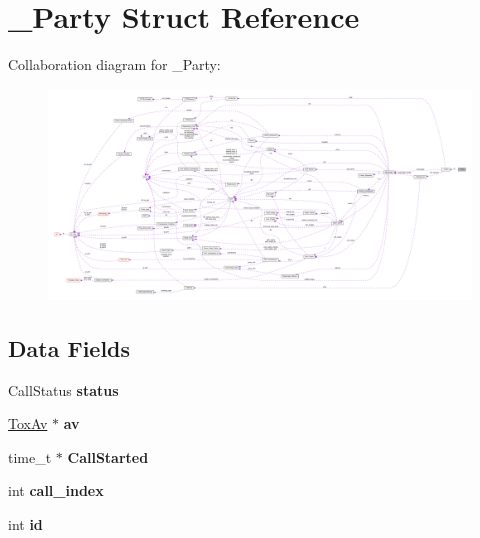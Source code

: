 \hypertarget{struct___party}{\section{\+\_\+\+Party Struct Reference}
\label{struct___party}
}


Collaboration diagram for \+\_\+\+Party\+:\nopagebreak
\begin{figure}[H]
\begin{center}
\leavevmode
\includegraphics[width=350pt]{struct___party__coll__graph}
\end{center}
\end{figure}
\subsection*{Data Fields}
\begin{DoxyCompactItemize}
\item 
\hypertarget{struct___party_a722fcd2c2e22cc6de0a53383e5871290}{Call\+Status {\bfseries status}}\label{struct___party_a722fcd2c2e22cc6de0a53383e5871290}

\item 
\hypertarget{struct___party_abcfe1d5431cfdb232964a0a3380f4e7e}{\hyperlink{struct___tox_av}{Tox\+Av} $\ast$ {\bfseries av}}\label{struct___party_abcfe1d5431cfdb232964a0a3380f4e7e}

\item 
\hypertarget{struct___party_a1695e5be04a1b45020f50e3a42d0e50c}{time\+\_\+t $\ast$ {\bfseries Call\+Started}}\label{struct___party_a1695e5be04a1b45020f50e3a42d0e50c}

\item 
\hypertarget{struct___party_a80d8424fa1a3824067bbf99be2b3b0c4}{int {\bfseries call\+\_\+index}}\label{struct___party_a80d8424fa1a3824067bbf99be2b3b0c4}

\item 
\hypertarget{struct___party_a7441ef0865bcb3db9b8064dd7375c1ea}{int {\bfseries id}}\label{struct___party_a7441ef0865bcb3db9b8064dd7375c1ea}

\end{DoxyCompactItemize}


